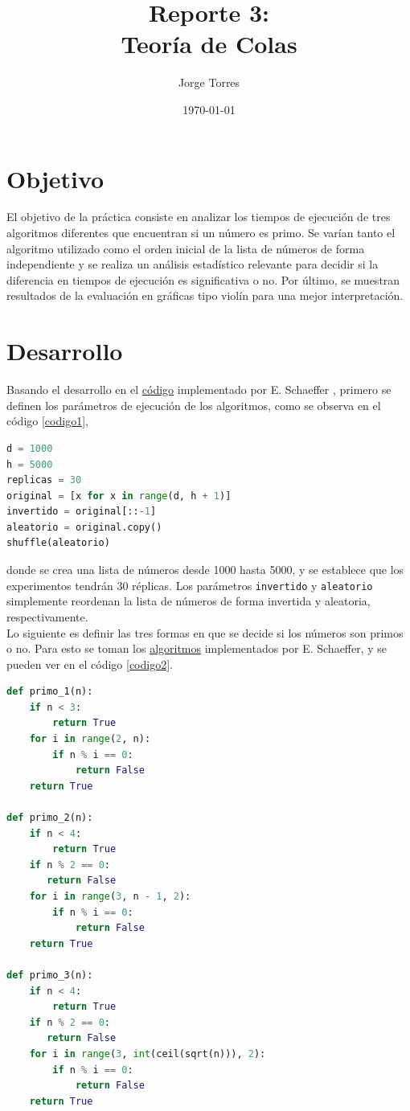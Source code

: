 \documentclass{article}
\title{Reporte 3:\\Teor\'ia de Colas}
\author{Jorge Torres}
\date{\today}
\begin{document}
\maketitle

\section{Objetivo}\label{obj}
El objetivo de la pr\'actica consiste en analizar los tiempos de ejecuci\'on de tres algoritmos diferentes que encuentran si un n\'umero es primo. Se var\'ian tanto el algoritmo utilizado como el orden inicial de la lista de n\'umeros de forma independiente y se realiza un an\'alisis estad\'istico relevante para decidir si la diferencia en tiempos de ejecuci\'on es significativa o no. Por \'ultimo, se muestran resultados de la evaluaci\'on en gr\'aficas tipo viol\'in para una mejor interpretaci\'on.

\section{Desarrollo}\label{des}
Basando el desarrollo en el \href{https://github.com/satuelisa/Simulation/blob/master/QueuingTheory/ordering.py}{c\'odigo} implementado por E. Schaeffer \cite{elisa1}, primero se definen los par\'ametros de ejecuci\'on de los algoritmos, como se observa en el c\'odigo \ref{codigo1},

\begin{lstlisting}[caption=Par\'ametros, label=codigo1, language=Python]
d = 1000
h = 5000
replicas = 30
original = [x for x in range(d, h + 1)]
invertido = original[::-1]
aleatorio = original.copy()
shuffle(aleatorio)
\end{lstlisting}
donde se crea una lista de n\'umeros desde 1000 hasta 5000, y se establece que los experimentos tendr\'an 30 r\'eplicas. Los par\'ametros \texttt{invertido} y \texttt{aleatorio} simplemente reordenan la lista de n\'umeros de forma invertida y aleatoria, respectivamente.\\

Lo siguiente es definir las tres formas en que se decide si los n\'umeros son primos o no. Para esto se toman los \href{https://satuelisa.github.io/simulation/p3.html}{algoritmos} implementados por E. Schaeffer, y se pueden ver en el c\'odigo \ref{codigo2}.

\begin{lstlisting}[caption=Algoritmos para encontrar n\'umeros primos, label=codigo2, language=Python]
def primo_1(n):
    if n < 3:
        return True
    for i in range(2, n):
        if n % i == 0:
            return False
    return True

def primo_2(n):
    if n < 4:
        return True
    if n % 2 == 0:
       return False
    for i in range(3, n - 1, 2):
        if n % i == 0:
            return False
    return True

def primo_3(n):
    if n < 4:
        return True
    if n % 2 == 0:
       return False
    for i in range(3, int(ceil(sqrt(n))), 2):
        if n % i == 0:
            return False
    return True
\end{lstlisting}
\end{document}
